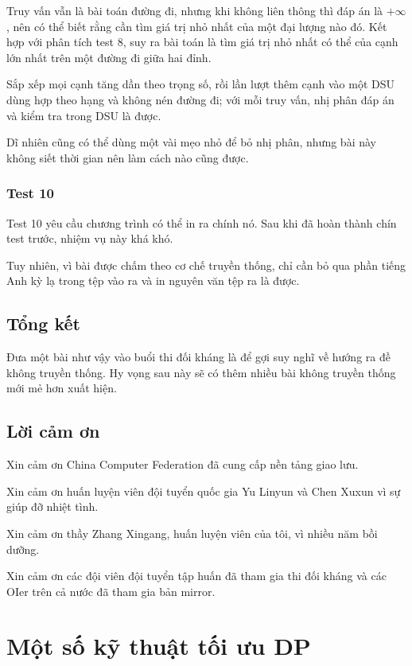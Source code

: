 \documentclass[11pt]{article}
\begin{document}
Truy vấn vẫn là bài toán đường đi, nhưng khi không liên thông thì đáp án là
\(+\infty\), nên có thể biết rằng cần tìm giá trị nhỏ nhất của một đại lượng
nào đó. Kết hợp với phân tích test 8, suy ra bài toán là tìm giá trị nhỏ nhất
có thể của cạnh lớn nhất trên một đường đi giữa hai đỉnh.

Sắp xếp mọi cạnh tăng dần theo trọng số, rồi lần lượt thêm cạnh vào một DSU
dùng hợp theo hạng và không nén đường đi; với mỗi truy vấn, nhị phân đáp án và
kiểm tra trong DSU là được.

Dĩ nhiên cũng có thể dùng một vài mẹo nhỏ để bỏ nhị phân, nhưng bài này không
siết thời gian nên làm cách nào cũng được.

\subsubsection{Test 10}

Test 10 yêu cầu chương trình có thể in ra chính nó. Sau khi đã hoàn thành chín
test trước, nhiệm vụ này khá khó.

Tuy nhiên, vì bài được chấm theo cơ chế truyền thống, chỉ cần bỏ qua phần tiếng
Anh kỳ lạ trong tệp vào ra và in nguyên văn tệp ra là được.

\subsection{Tổng kết}

Đưa một bài như vậy vào buổi thi đối kháng là để gợi suy nghĩ về hướng ra đề
không truyền thống. Hy vọng sau này sẽ có thêm nhiều bài không truyền thống mới
mẻ hơn xuất hiện.

\subsection{Lời cảm ơn}

Xin cảm ơn China Computer Federation đã cung cấp nền tảng giao lưu.

Xin cảm ơn huấn luyện viên đội tuyển quốc gia Yu Linyun và Chen Xuxun vì sự
giúp đỡ nhiệt tình.

Xin cảm ơn thầy Zhang Xingang, huấn luyện viên của tôi, vì nhiều năm bồi dưỡng.

Xin cảm ơn các đội viên đội tuyển tập huấn đã tham gia thi đối kháng và các
OIer trên cả nước đã tham gia bản mirror.

\section{Một số kỹ thuật tối ưu DP}
\end{document}

